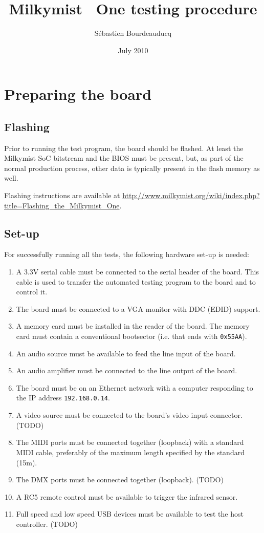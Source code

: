 \documentclass[a4paper,11pt]{article}
\title{Milkymist\texttrademark~ One testing procedure}
\author{S\'ebastien Bourdeauducq}
\date{July 2010}
\begin{document}
\setlength{\parindent}{0pt}
\setlength{\parskip}{5pt}
\maketitle{}


\section{Preparing the board}
\subsection{Flashing}
Prior to running the test program, the board should be flashed. At least the Milkymist SoC bitstream and the BIOS must be present, but, as part of the normal production process, other data is typically present in the flash memory as well.

Flashing instructions are available at \url{http://www.milkymist.org/wiki/index.php?title=Flashing_the_Milkymist_One}.

\subsection{Set-up}
For successfully running all the tests, the following hardware set-up is needed:
\begin{enumerate}
\item A 3.3V serial cable must be connected to the serial header of the board. This cable is used to transfer the automated testing program to the board and to control it.
\item The board must be connected to a VGA monitor with DDC (EDID) support.
\item A memory card must be installed in the reader of the board. The memory card must contain a conventional bootsector (i.e. that ends with \verb!0x55AA!).
\item An audio source must be available to feed the line input of the board.
\item An audio amplifier must be connected to the line output of the board.
\item The board must be on an Ethernet network with a computer responding to the IP address \verb!192.168.0.14!.
\item A video source must be connected to the board's video input connector. (TODO)
\item The MIDI ports must be connected together (loopback) with a standard MIDI cable, preferably of the maximum length specified by the standard (15m).
\item The DMX ports must be connected together (loopback). (TODO)
\item A RC5 remote control must be available to trigger the infrared sensor.
\item Full speed and low speed USB devices must be available to test the host controller. (TODO)
\end{enumerate}
\end{document}
